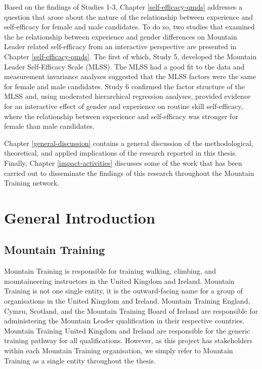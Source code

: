 \documentclass[
  12pt,
  a4paper,
]{book}
\begin{document}
Based on the findings of Studies 1-3, Chapter \ref{self-efficacy-qmds} addresses a question that arose about the nature of the relationship between experience and self-efficacy for female and male candidates. To do so, two studies that examined the he relationship between experience and gender differences on Mountain Leader related self-efficacy from an interactive perspective are presented in Chapter \ref{self-efficacy-qmds}. The first of which, Study 5, developed the Mountain Leader Self-Efficacy Scale (MLSS). The MLSS had a good fit to the data and measurement invariance analyses suggested that the MLSS factors were the same for female and male candidates. Study 6 confirmed the factor structure of the MLSS and, using moderated hierarchical regression analyses, provided evidence for an interactive effect of gender and experience on routine skill self-efficacy, where the relationship between experience and self-efficacy was stronger for female than male candidates.

Chapter \ref{general-discussion} contains a general discussion of the methodological, theoretical, and applied implications of the research reported in this thesis. Finally, Chapter \ref{impact-activities} discusses some of the work that has been carried out to disseminate the findings of this research throughout the Mountain Training network.

\hypertarget{gen-intro}{%
\chapter{General Introduction}\label{gen-intro}}

\hypertarget{mountain-training}{%
\section{Mountain Training}\label{mountain-training}}

Mountain Training is responsible for training walking, climbing, and mountaineering instructors in the United Kingdom and Ireland. Mountain Training is not one single entity, it is the outward-facing name for a group of organisations in the United Kingdom and Ireland. Mountain Training England, Cymru, Scotland, and the Mountain Training Board of Ireland are responsible for administering the Mountain Leader qualification in their respective countries. Mountain Training United Kingdom and Ireland are responsible for the generic training pathway for all qualifications. However, as this project has stakeholders within each Mountain Training organisation, we simply refer to Mountain Training as a single entity throughout the thesis.
\end{document}
